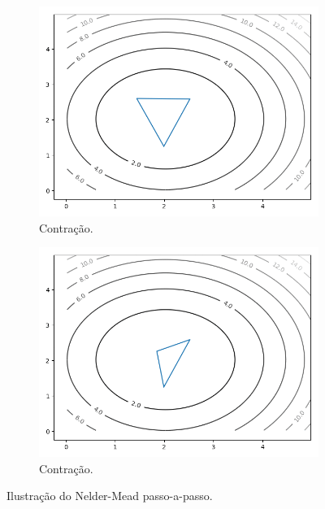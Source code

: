 \begin{figure}
\begin{subfigure}{.3\textwidth}
  \includegraphics[width=\linewidth]{figs/neldermeadexample/target-4.png}
  \caption{Contração.}
\end{subfigure}
\begin{subfigure}{.3\textwidth}
  \centering
  \includegraphics[width=\linewidth]{figs/neldermeadexample/target-5.png}
  \caption{Contração.}
\end{subfigure}
\caption{Ilustração do Nelder-Mead passo-a-passo.}
\label{fig:neldermeadsteps}
\end{figure}

